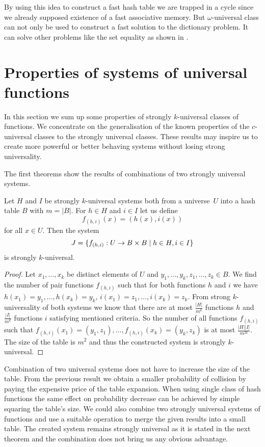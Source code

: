 By using this idea to construct a fast hash table we are trapped in a cycle since we already supposed existence of a fast associative memory. But $\omega$-universal class can not only be used to construct a fast solution to the dictionary problem. It can solve other problems like the set equality as shown in \cite{1382617}.

\section{Properties of systems of universal functions}
In this section we sum up some properties of strongly $k$-universal classes of functions. We concentrate on the generalisation of the known properties of the $c$-universal classes to the strongly universal classes. These results may inspire us to create more powerful or better behaving systems without losing strong universality.

The first theorems show the results of combinations of two strongly universal systems.
\begin{theorem}
\label{theorem-pair-system}
Let $H$ and $I$ be strongly $k$-universal systems both from a universe~$U$ into a hash table $B$ with $m = |B|$. For $h\in H$ and $i\in I$ let us define \[ f_{(h, i)}(x)= (h(x), i(x)) \] for all $x \in U$. Then the system
\[
	J = \{f_{(h, i)}: U \rightarrow B \times B \mid h \in H, i \in I \}
\]
is strongly $k$-universal.
\end{theorem}
\begin{proof}
Let $x_1, \dots, x_k$ be distinct elements of $U$ and $y_1, \dots, y_k, z_1, \dots, z_k \in B$. We find the number of pair functions $f_{(h, i)}$ such that for both functions $h$ and $i$ we have $h(x_1) = y_1, \dots, h(x_k) = y_k$, $i(x_1) = z_1, \dots, i(x_k) = z_k$. From strong $k$-universality of both systems we know that there are at most $\frac{|H|}{m^k}$ functions $h$ and $\frac{|I|}{m^k}$ functions $i$ satisfying mentioned criteria. So the number of all functions $f_{(h, i)}$ such that $f_{(h, i)}(x_1) = (y_1, z_1), \dots, f_{(h, i)}(x_k) = (y_k, z_k)$ is at most $\frac{|H||I|}{m^{2k}}$. The size of the table is $m^2$ and thus the constructed system is strongly $k$-universal.
\end{proof}

Combination of two universal systems does not have to increase the size of the table. From the previous result we obtain a smaller probability of collision by paying the expensive price of the table expansion. When using single class of hash functions the same effect on probability decrease can be achieved by simple squaring the table's size. We could also combine two strongly universal systems of functions and use a suitable operation to merge the given results into a small table. The created system remains strongly universal as it is stated in the next theorem and the combination does not bring us any obvious advantage.

